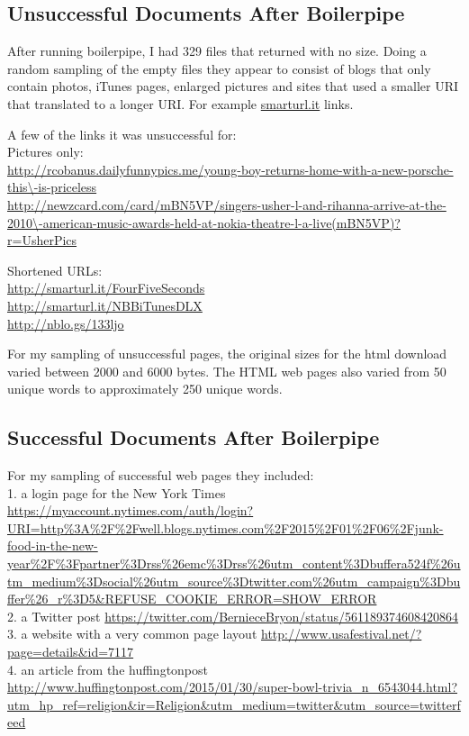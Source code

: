 \documentclass[12pt]{article}
\begin{document}
\subsection{Unsuccessful Documents After Boilerpipe}
After running boilerpipe, I had 329 files that returned with no size. Doing a random sampling of the empty files they appear to consist of blogs that only contain photos, iTunes pages, enlarged pictures and sites that used a smaller URI that translated to a longer URI. For example \url{smarturl.it} links.

A few of the links it was unsuccessful for:\\
Pictures only:\\
\url{http://rcobanus.dailyfunnypics.me/young-boy-returns-home-with-a-new-porsche-this\-is-priceless}\\
\url{http://newzcard.com/card/mBN5VP/singers-usher-l-and-rihanna-arrive-at-the-2010\-american-music-awards-held-at-nokia-theatre-l-a-live(mBN5VP)?r=UsherPics}

Shortened URLs:\\
\url{http://smarturl.it/FourFiveSeconds}\\
\url{http://smarturl.it/NBBiTunesDLX}\\
\url{http://nblo.gs/133ljo}

For my sampling of unsuccessful pages, the original sizes for the html download varied between 2000 and 6000 bytes. The HTML web pages also varied from 50 unique words to approximately 250 unique words.

\subsection{Successful Documents After Boilerpipe}
For my sampling of successful web pages they included:\\
1. a login page for the New York Times \url{https://myaccount.nytimes.com/auth/login?URI=http%3A%2F%2Fwell.blogs.nytimes.com%2F2015%2F01%2F06%2Fjunk-food-in-the-new-year%2F%3Fpartner%3Drss%26emc%3Drss%26utm_content%3Dbuffera524f%26utm_medium%3Dsocial%26utm_source%3Dtwitter.com%26utm_campaign%3Dbuffer%26_r%3D5&REFUSE_COOKIE_ERROR=SHOW_ERROR}\\
2. a Twitter post \url{https://twitter.com/BernieceBryon/status/561189374608420864}\\
3. a website with a very common page layout \url{http://www.usafestival.net/?page=details&id=7117}\\
4. an article from the huffingtonpost \url{http://www.huffingtonpost.com/2015/01/30/super-bowl-trivia_n_6543044.html?utm_hp_ref=religion&ir=Religion&utm_medium=twitter&utm_source=twitterfeed}
\end{document}
